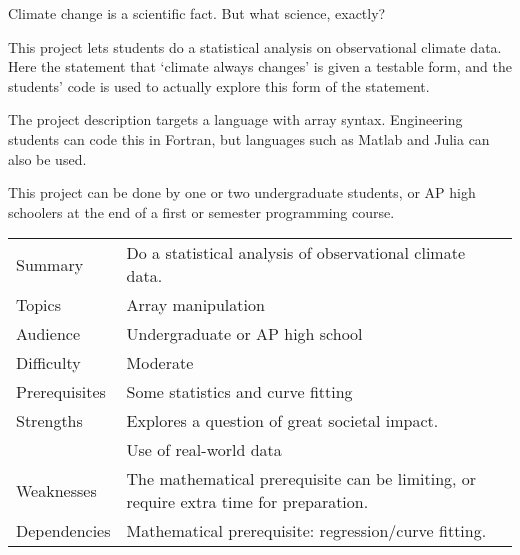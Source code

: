 
Climate change is a scientific fact.
But what science, exactly?

This project lets students do a statistical analysis
on observational climate data.
Here the statement that `climate always changes' is given
a testable form, and the students' code is used to actually
explore this form of the statement.

The project description targets a language with array syntax.
Engineering students can code this in Fortran, but
languages such as Matlab and Julia can also be used.

This project can be done by one or two undergraduate students,
or AP high schoolers
at the end of a first or semester programming course.

\newpage

\begin{tabular}{|l|p{5in}|}
  \hline
  Summary&Do a statistical analysis of observational climate data.
  \\
  Topics&Array manipulation
  \\
  Audience&Undergraduate or AP high school
  \\
  Difficulty&Moderate
  \\
  Prerequisites&Some statistics and curve fitting
  \\
  Strengths&Explores a question of great societal impact.
  \\ &Use of real-world data
  \\
  Weaknesses&The mathematical prerequisite can be limiting,
  or require extra time for preparation.
  \\
  Dependencies&Mathematical prerequisite: regression/curve fitting.
  \\
  \hline
\end{tabular}
